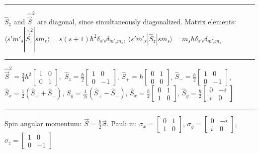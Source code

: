 
\hrule height 0.05pt

$\widehat{S}_z$ and $\widehat{\vec{S}}^2$ are diagonal, since simultaneously diagonalized. Matrix elements: $\langle s' m'_s | \widehat{\vec{S}}^2 | sm_s \rangle = s(s+1) \hbar^2 \delta_{s' s} \delta_{m'_s m_s}$, $\langle s' m'_s | \widehat{S}_z | sm_s \rangle = m_s \hbar \delta_{s' s} \delta_{m'_s m_s}$

\hrule height 0.05pt

\tiny
$\widehat{\vec{S}}^2 = \frac{3}{4} \hbar^2 \begin{bmatrix} 1 & 0 \\ 0 & 1 \end{bmatrix},$
$\widehat{S}_z = \frac{\hbar}{2} \begin{bmatrix} 1 & 0 \\ 0 & -1 \end{bmatrix}$.
$\widehat{S}_{+} = \hbar \begin{bmatrix} 0 & 1 \\ 0 & 0 \end{bmatrix}$,
$\widehat{S}_{-} = \frac{\hbar}{2} \begin{bmatrix} 1 & 0 \\ 0 & -1 \end{bmatrix}$,
$\widehat{S}_x = \frac{1}{2}(\widehat{S}_{+} + \widehat{S}_{-})$,
$\widehat{S}_y = \frac{1}{2i}(\widehat{S}_{+} - \widehat{S}_{-})$,
$\widehat{S}_x = \frac{\hbar}{2} \begin{bmatrix} 0 & 1 \\ 1 & 0 \end{bmatrix}$,
$\widehat{S}_y = \frac{\hbar}{2} \begin{bmatrix} 0 & -i \\ i & 0 \end{bmatrix}$
\scriptsize

\hrule height 0.05pt

\tiny 
Spin angular momentum: $\vec{S} = \frac{\hbar}{2} \vec{\sigma}$. 
Pauli m: $\sigma_x = \begin{bmatrix} 0 & 1 \\ 1 & 0 \end{bmatrix}$, $\sigma_y = \begin{bmatrix} 0 & -i \\ i & 0 \end{bmatrix}$, $\sigma_z = \begin{bmatrix} 1 & 0 \\ 0 & -1 \end{bmatrix}$
\scriptsize

